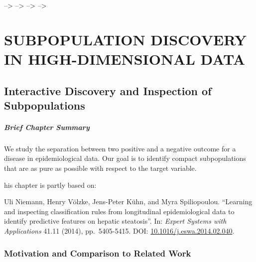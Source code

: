 \documentclass[
  oneside]{book}
\newenvironment{infobox}[1]
  {
  \begin{chapter-summary}
  }
  {
  \end{chapter-summary}
  }
\begin{document}
--\textgreater{}
--\textgreater{}
--\textgreater{}
--\textgreater{}

\hypertarget{part-subpopulation-discovery-in-high-dimensional-data}{%
\part{SUBPOPULATION DISCOVERY IN HIGH-DIMENSIONAL DATA}\label{part-subpopulation-discovery-in-high-dimensional-data}}

\hypertarget{imm}{%
\chapter{Interactive Discovery and Inspection of Subpopulations}\label{imm}}

\begin{infobox}{tasks.pdf}

\hypertarget{brief-chapter-summary}{%
\subsubsection*{Brief Chapter Summary}\label{brief-chapter-summary}}

We study the separation between two positive and a negative outcome for a disease in epidemiological data.
Our goal is to identify compact subpopulations that are as pure as possible with respect to the target variable.

\end{infobox}

\begin{infobox}

This chapter is partly based on:

Uli Niemann, Henry Völzke, Jens-Peter Kühn, and Myra Spiliopoulou. ``Learning and inspecting classification rules from longitudinal epidemiological data to identify predictive features on hepatic steatosis''. In: \emph{Expert Systems with Applications} 41.11 (2014), pp.~5405-5415. DOI: \href{https://doi.org/10.1016\%2Fj.eswa.2014.02.040}{10.1016/j.eswa.2014.02.040}.

\end{infobox}

\hypertarget{motivation-and-comparison-to-related-work}{%
\section{Motivation and Comparison to Related Work}\label{motivation-and-comparison-to-related-work}}
\end{document}
